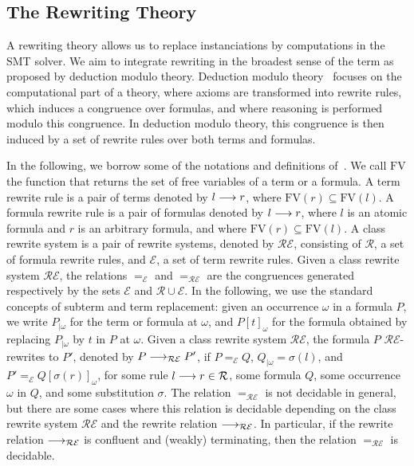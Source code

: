 \subsection{The Rewriting Theory}
\label{sec:rew}

A rewriting theory allows us to replace instanciations by
computations in the SMT solver. We aim to integrate rewriting in the broadest sense of the term as
proposed by deduction modulo theory. Deduction modulo theory~\cite{DA03} focuses
on the computational part of a theory, where axioms are transformed into rewrite
rules, which induces a congruence over formulas, and where reasoning is
performed modulo this congruence. In deduction modulo theory, this congruence is
then induced by a set of rewrite rules over both terms and formulas.

In the following, we borrow some of the notations and definitions
of~\cite{DA03}. We call $\mathrm{FV}$ the function that returns the set of
free variables of a term or a formula. A term rewrite rule is a pair of terms
denoted by $l\longrightarrow{}r$, where $\mathrm{FV}(r)\subseteq\mathrm{FV}(l)$. A
formula rewrite rule is a pair of formulas denoted by $l\longrightarrow{}r$, where
$l$ is an atomic formula and $r$ is an arbitrary formula, and where
$\mathrm{FV}(r)\subseteq\mathrm{FV}(l)$. A class rewrite system is a pair of
rewrite systems, denoted by $\mathcal{RE}$, consisting of $\mathcal{R}$, a set
of formula rewrite rules, and $\mathcal{E}$, a set of term rewrite rules.
Given a class rewrite system $\mathcal{RE}$, the relations $=_\mathcal{E}$ and
$=_\mathcal{RE}$ are the congruences generated respectively by the sets
$\mathcal{E}$ and $\mathcal{R}\cup\mathcal{E}$. In the following, we use the
standard concepts of subterm and term replacement: given an occurrence $\omega$
in a formula $P$, we write $P_{|\omega}$ for the term or formula at
$\omega$, and $P[t]_\omega$ for the formula obtained by replacing
$P_{|\omega}$ by $t$ in $P$ at $\omega$. Given a class rewrite system
$\mathcal{RE}$, the formula $P$ $\mathcal{RE}$-rewrites to $P'$, denoted by
$P\longrightarrow_\mathcal{RE}P'$, if $P=_\mathcal{E}Q$, $Q_{|\omega}=\sigma(l)$, and
$P'=_\mathcal{E}Q[\sigma(r)]_\omega$, for some rule $l\longrightarrow{}r\in\mathcal{R}$,
some formula $Q$, some occurrence $\omega$ in $Q$, and some substitution
$\sigma$. The relation $=_\mathcal{RE}$ is not decidable in general, but there are some
cases where this relation is decidable depending on the class rewrite system
$\mathcal{RE}$ and the rewrite relation $\longrightarrow_\mathcal{RE}$. In particular, if
the rewrite relation $\longrightarrow_\mathcal{RE}$ is confluent and (weakly) terminating,
then the relation $=_\mathcal{RE}$ is decidable.

